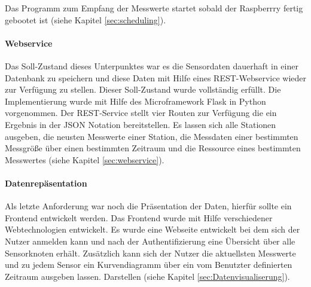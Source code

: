 Das Programm zum Empfang der Messwerte startet sobald der Raspberrry fertig gebootet ist (siehe Kapitel \ref{sec:scheduling}).
\paragraph{Webservice} Das Soll-Zustand dieses Unterpunktes war es die Sensordaten dauerhaft in einer Datenbank zu speichern und diese Daten mit Hilfe eines REST-Webservice wieder zur Verfügung zu stellen. Dieser Soll-Zustand wurde vollständig erfüllt. Die Implementierung wurde mit Hilfe des Microframework Flask in Python vorgenommen. Der REST-Service stellt vier Routen zur Verfügung die ein Ergebnis in der JSON Notation bereitstellen. Es lassen sich alle Stationen ausgeben, die neusten Messwerte einer Station, die Messdaten einer bestimmten Messgröße über einen bestimmten Zeitraum und die Ressource eines bestimmten Messwertes (siehe Kapitel \ref{sec:webservice}).
\paragraph{Datenrepäsentation} Als letzte Anforderung war noch die Präsentation der Daten, hierfür sollte ein Frontend entwickelt werden. Das Frontend wurde mit Hilfe verschiedener Webtechnologien entwickelt. Es wurde eine Webseite entwickelt bei dem sich der Nutzer anmelden kann und nach der Authentifizierung eine Übersicht über alle Sensorknoten erhält. Zusätzlich kann sich der Nutzer die aktuellsten Messwerte und zu jedem Sensor ein Kurvendiagramm über ein vom Benutzter definierten Zeitraum ausgeben lassen. Darstellen (siehe Kapitel \ref{sec:Datenvisualiserung}).


